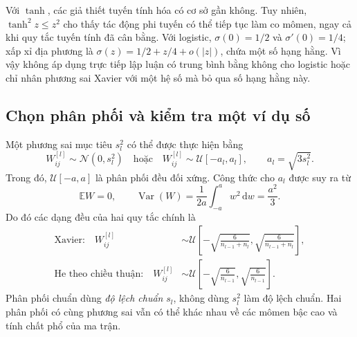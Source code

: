 Với $\tanh$, các giả thiết tuyến tính hóa có cơ sở gần không.
Tuy nhiên, $\tanh^2z\leq z^2$ cho thấy tác động phi tuyến có thể
tiếp tục làm co mômen, ngay cả khi quy tắc tuyến tính đã cân bằng.
Với logistic, $\sigma(0)=1/2$ và $\sigma'(0)=1/4$; xấp xỉ địa
phương là $\sigma(z)=1/2+z/4+o(|z|)$, chứa một số hạng hằng.
Vì vậy không áp dụng trực tiếp lập luận có trung bình bằng không
cho logistic hoặc chỉ nhân phương sai Xavier với một hệ số mà
bỏ qua số hạng hằng này.

\subsection{Chọn phân phối và kiểm tra một ví dụ số}

Một phương sai mục tiêu $s_l^2$ có thể được thực hiện bằng
\begin{equation}
 W_{ij}^{[l]}\sim\mathcal N(0,s_l^2)
 \quad\text{hoặc}\quad
 W_{ij}^{[l]}\sim\mathcal U[-a_l,a_l],\qquad a_l=\sqrt{3s_l^2}.
 \label{kt:eq:distributions}
\end{equation}
Trong đó, $\mathcal U[-a,a]$ là phân phối đều đối xứng. Công thức
cho $a_l$ được suy ra từ
\begin{equation}
 \mathbb EW=0,\qquad
 \operatorname{Var}(W)=\frac1{2a}\int_{-a}^{a}w^2\,\mathrm dw
                     =\frac{a^2}{3}.
 \label{kt:eq:uniform-variance}
\end{equation}
Do đó các dạng đều của hai quy tắc chính là
\begin{align}
 \text{Xavier:}\quad
 W_{ij}^{[l]}&\sim\mathcal U\left[
 -\sqrt{\frac6{n_{l-1}+n_l}},\sqrt{\frac6{n_{l-1}+n_l}}\right],
 \label{kt:eq:xavier-uniform}\\
 \text{He theo chiều thuận:}\quad
 W_{ij}^{[l]}&\sim\mathcal U\left[
 -\sqrt{\frac6{n_{l-1}}},\sqrt{\frac6{n_{l-1}}}\right].
 \label{kt:eq:he-uniform}
\end{align}
Phân phối chuẩn dùng \emph{độ lệch chuẩn} $s_l$, không dùng
$s_l^2$ làm độ lệch chuẩn. Hai phân phối có cùng phương sai vẫn
có thể khác nhau về các mômen bậc cao và tính chất phổ của ma trận.

